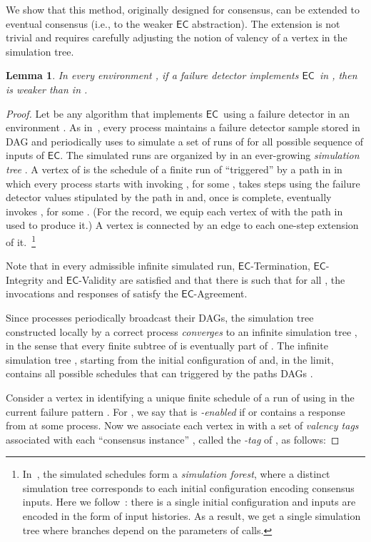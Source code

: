 \documentclass[11pt]{article}
\newtheorem{lemma}{Lemma}
\newcommand{\EC}{\ensuremath{\mathsf{EC}}}
\begin{document}
We show that this method, originally designed for
consensus, can be extended to eventual consensus (i.e., to the  weaker {\EC} abstraction). The extension is not trivial 
and requires carefully adjusting the notion of valency of a vertex in the
simulation tree.

\begin{lemma}\label{lem:NecessityOmegaEC}
In every environment , if a failure detector  implements \EC~in , then  is weaker than  in .
\end{lemma}

\begin{proof}
Let  be any algorithm that implements \EC~using
a failure detector  in an environment .
As in~\cite{CHT96}, every process  maintains a failure detector sample
stored in DAG  and periodically uses  to simulate a set of
runs of  for all possible sequence of inputs of {\EC}.
The simulated runs are organized by  in an ever-growing \emph{simulation
tree} .
A vertex of  is the schedule of a finite run of 
``triggered'' by a path in  in which every process starts with invoking
, for some , takes steps using the failure detector
values stipulated by the path in  and, once 
is complete, eventually invokes
, for some .
(For the record, we equip each vertex of  with the path in  used to produce it.)
A vertex is connected by an edge to each one-step extension
of it.~\footnote{In~\cite{CHT96},  the simulated schedules form
  a \emph{simulation forest}, where a distinct simulation tree
  corresponds to each initial configuration encoding
  consensus inputs. Here we
  follow~\cite{JT08}: there is a single initial configuration and inputs
  are encoded in the form of input histories. As a result, we get a
  single simulation tree where branches depend on the parameters of
   calls.}

Note that in every admissible infinite simulated run,
\EC-Termination, \EC-Integrity and \EC-Validity
are satisfied and that there is 
such that for all , the invocations and responses of
 satisfy the \EC-Agreement.

Since processes periodically broadcast their DAGs,
the simulation tree  constructed locally by a correct process 
\emph{converges} to an infinite simulation tree ,
in the sense that every finite subtree of
  is eventually part of .
The infinite simulation tree , starting
from the initial configuration of  and, in the limit, contains
all possible schedules that can triggered by the paths DAGs .

Consider a vertex  in  identifying a unique finite
schedule of a run  of  using  in the current failure
pattern . For , we say that  is \emph{-enabled} if  or 
contains a response from  at some process.
Now we associate each vertex  in  with a set of
\emph{valency tags} associated with each ``consensus instance''  ,
called the \emph{-tag} of , as follows:


\end{proof}
\end{document}
